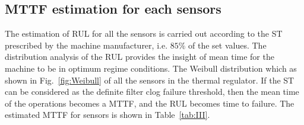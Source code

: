 \documentclass[conference]{IEEEtran}
\begin{document}
\subsection{MTTF estimation for each sensors}
\label{subsec:MTTF}
The estimation of RUL for all the sensors is carried out according to the ST prescribed by the machine manufacturer, i.e. $85\%$ of the set values. The distribution analysis of the RUL provides the insight of mean time for the machine to be in optimum regime conditions. The Weibull distribution which as shown in Fig.~\ref{fig:Weibull} of all the sensors in the thermal regulator. If the ST can be considered as the definite filter clog failure threshold, then the mean time of the operations becomes a MTTF, and the RUL becomes time to failure. The estimated MTTF for sensors is shown in Table~\ref{tab:III}.
\end{document}
